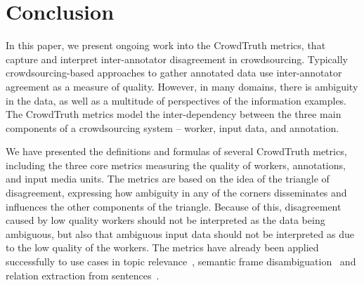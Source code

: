 \section{Conclusion}

In this paper, we present ongoing work into the CrowdTruth metrics, that capture and interpret inter-annotator disagreement in crowdsourcing. Typically crowdsourcing-based approaches to gather annotated data use inter-annotator agreement as a measure of quality. However, in many domains, there is ambiguity in the data, as well as a multitude of perspectives of the information examples. The CrowdTruth metrics model the inter-dependency between the three main components of a crowdsourcing system -- worker, input data, and annotation.

We have presented the definitions and formulas of several CrowdTruth metrics, including the three core metrics measuring the quality of workers, annotations, and input media units. The metrics are based on the idea of the triangle of disagreement, expressing how ambiguity in any of the corners disseminates and influences the other components of the triangle. Because of this, disagreement caused by low quality workers should not be interpreted as the data being ambiguous, but also that ambiguous input data should not be interpreted as due to the low quality of the workers. The metrics have already been applied successfully to use cases in topic relevance~\cite{inel2018studying}, semantic frame disambiguation~\cite{dumitrache2018capturing} and relation extraction from sentences~\cite{dumitrache2017false}.
